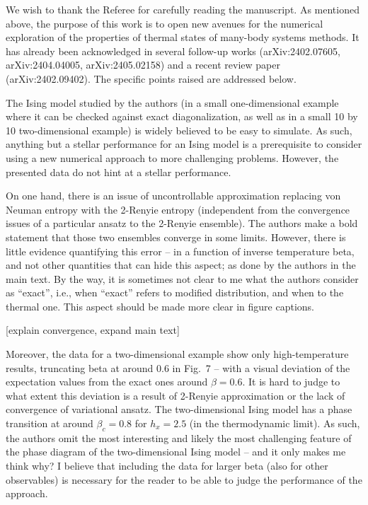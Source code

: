 \documentclass[a4paper,12pt]{article}
\newenvironment{referee}[1]
{\noindent {\bf Referee #1}}
{\vspace{1em}}
\newenvironment{response}
{\noindent \color{blue!40!black}{\bf Response}}
{\vspace{1em}}
\begin{document}
\begin{response}
	We wish to thank the Referee for carefully reading the manuscript.
	As mentioned above, the purpose of this work is to open new avenues for the numerical exploration of the properties of thermal states of many-body systems methods.
	It has already been acknowledged in several follow-up works (arXiv:2402.07605, arXiv:2404.04005, arXiv:2405.02158) and a recent review paper (arXiv:2402.09402).
	The specific points raised are addressed below.
\end{response}

\begin{referee}{B}
	The Ising model studied by the authors (in a small one-dimensional example where it can be checked against exact diagonalization, as well as in a small 10 by 10 two-dimensional example) is widely believed to be easy to simulate.
	As such, anything but a stellar performance for an Ising model is a prerequisite to consider using a new numerical approach to more challenging problems.
	However, the presented data do not hint at a stellar performance.

	On one hand, there is an issue of uncontrollable approximation replacing von Neuman entropy with the 2-Renyie entropy (independent from the convergence issues of a particular ansatz to the 2-Renyie ensemble).
	The authors make a bold statement that those two ensembles converge in some limits.
	However, there is little evidence quantifying this error -- in a function of inverse temperature beta, and not other quantities that can hide this aspect; as done by the authors in the main text.
	By the way, it is sometimes not clear to me what the authors consider as ``exact'', i.e., when ``exact'' refers to modified distribution, and when to the thermal one.
	This aspect should be made more clear in figure captions.
\end{referee}

\begin{response}
	[explain convergence, expand main text]
\end{response}

\begin{referee}{B}
	Moreover, the data for a two-dimensional example show only high-temperature results, truncating beta at around 0.6 in Fig.~7 -- with a visual deviation of the expectation values from the exact ones around $\beta=0.6$.
	It is hard to judge to what extent this deviation is a result of 2-Renyie approximation or the lack of convergence of variational ansatz.
	The two-dimensional Ising model has a phase transition at around $\beta_c=0.8$ for $h_x = 2.5$ (in the thermodynamic limit).
	As such, the authors omit the most interesting and likely the most challenging feature of the phase diagram of the two-dimensional Ising model -- and it only makes me think why?
	I believe that including the data for larger beta (also for other observables) is necessary for the reader to be able to judge the performance of the approach.
\end{referee}
\end{document}
